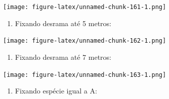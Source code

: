 \documentclass[
]{article}
\newenvironment{Shaded}{\begin{snugshade}}{\end{snugshade}}
\newcommand{\DataTypeTok}[1]{\textcolor[rgb]{0.13,0.29,0.53}{#1}}
\newcommand{\DecValTok}[1]{\textcolor[rgb]{0.00,0.00,0.81}{#1}}
\newcommand{\KeywordTok}[1]{\textcolor[rgb]{0.13,0.29,0.53}{\textbf{#1}}}
\newcommand{\NormalTok}[1]{#1}
\newcommand{\OperatorTok}[1]{\textcolor[rgb]{0.81,0.36,0.00}{\textbf{#1}}}
\newcommand{\StringTok}[1]{\textcolor[rgb]{0.31,0.60,0.02}{#1}}
\providecommand{\tightlist}{%
  \setlength{\itemsep}{0pt}\setlength{\parskip}{0pt}}
\begin{document}
\begin{Shaded}
\end{Shaded}

\texttt{[image: figure-latex/unnamed-chunk-161-1.png]}

\begin{enumerate}
\def\labelenumi{\arabic{enumi}.}
\setcounter{enumi}{4}
\tightlist
\item
  Fixando desrama até 5 metros:
\end{enumerate}

\begin{Shaded}
\end{Shaded}

\texttt{[image: figure-latex/unnamed-chunk-162-1.png]}

\begin{enumerate}
\def\labelenumi{\arabic{enumi}.}
\setcounter{enumi}{5}
\tightlist
\item
  Fixando desrama até 7 metros:
\end{enumerate}

\begin{Shaded}
\end{Shaded}

\texttt{[image: figure-latex/unnamed-chunk-163-1.png]}

\begin{enumerate}
\def\labelenumi{\arabic{enumi}.}
\setcounter{enumi}{6}
\tightlist
\item
  Fixando espécie igual a A:
\end{enumerate}
\end{document}

